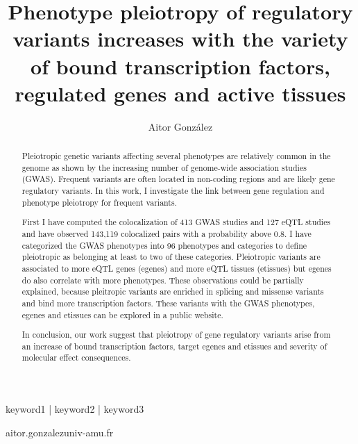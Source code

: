 
\title{Phenotype pleiotropy of regulatory variants increases with the variety of bound transcription factors, regulated genes and active tissues}
	
\author[1,\Letter]{Aitor González }
\date{}

\maketitle

\begin{abstract}

Pleiotropic genetic variants affecting several phenotypes are relatively common in the genome as shown by the increasing number of genome-wide association studies (GWAS).
%
Frequent variants are often located in non-coding regions and are likely gene regulatory variants.
%
In this work, I investigate the link between gene regulation and phenotype pleiotropy for frequent variants.

First I have computed the colocalization of 413 GWAS studies and 127 eQTL studies and have observed 143,119 colocalized pairs with a probability above 0.8.
%
I have categorized the GWAS phenotypes into 96 phenotypes and categories to define pleiotropic as belonging at least to two of these categories.
%
Pleiotropic variants are associated to more eQTL genes (egenes) and more eQTL tissues (etissues) but egenes do also correlate with more phenotypes.
%
These observations could be partially explained, because pleitropic variants are enriched in splicing and missense variants and bind more transcription factors.
%
These variants with the GWAS phenotypes, egenes and etissues can be explored in a public website.

In conclusion, our work suggest that pleiotropy of gene regulatory variants arise from an increase of bound transcription factors, target egenes and etissues and severity of molecular effect consequences.

\end{abstract}

\begin{keywords}
keyword1 | keyword2 | keyword3
\end{keywords}

\begin{corrauthor}
aitor.gonzalez\at univ-amu.fr
\end{corrauthor}


